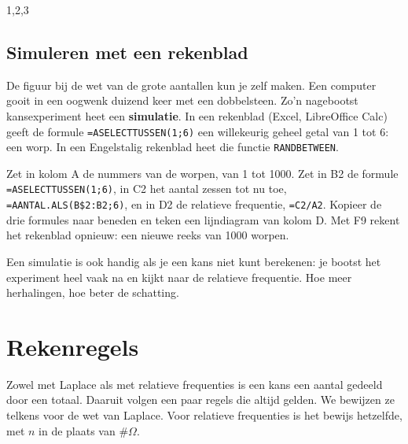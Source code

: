 \begin{oefeningen}
\end{oefeningen}
\begin{alleenvoor}{1,2,3}

\subsection{Simuleren met een rekenblad}

De figuur bij de wet van de grote aantallen kun je zelf maken. Een computer gooit in een oogwenk duizend keer met een dobbelsteen. Zo'n nagebootst kansexperiment heet een \textbf{simulatie}. In een rekenblad (Excel, LibreOffice Calc) geeft de formule \texttt{=ASELECTTUSSEN(1;6)} een willekeurig geheel getal van 1 tot 6: een worp. In een Engelstalig rekenblad heet die functie \texttt{RANDBETWEEN}.

\begin{werkwijze}
Zet in kolom A de nummers van de worpen, van 1 tot 1000. Zet in B2 de formule \texttt{=ASELECTTUSSEN(1;6)}, in C2 het aantal zessen tot nu toe, \texttt{=AANTAL.ALS(B\$2:B2;6)}, en in D2 de relatieve frequentie, \texttt{=C2/A2}. Kopieer de drie formules naar beneden en teken een lijndiagram van kolom D. Met F9 rekent het rekenblad opnieuw: een nieuwe reeks van 1000 worpen.
\end{werkwijze}

Een simulatie is ook handig als je een kans niet kunt berekenen: je bootst het experiment heel vaak na en kijkt naar de relatieve frequentie. Hoe meer herhalingen, hoe beter de schatting.

\begin{oefeningen}
\end{oefeningen}
\end{alleenvoor}

\section{Rekenregels}

Zowel met Laplace als met relatieve frequenties is een kans een aantal gedeeld door een totaal. Daaruit volgen een paar regels die altijd gelden. We bewijzen ze telkens voor de wet van Laplace. Voor relatieve frequenties is het bewijs hetzelfde, met $n$ in de plaats van $\#\Omega$.


